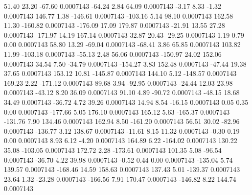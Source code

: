        51.40       23.20      -67.60     0.0007143
      -64.24        2.84       64.09     0.0007143
       -3.17        8.33       -1.32     0.0007143
      146.77        1.38     -146.61     0.0007143
     -103.16        5.14       98.10     0.0007143
      162.58       11.30     -160.82     0.0007143
     -176.09       17.09      179.87     0.0007143
      -21.91       13.55       27.28     0.0007143
     -171.97       14.19      167.14     0.0007143
       32.87       20.43      -29.25     0.0007143
        1.19        0.79        0.00     0.0007143
       58.80       13.29      -69.04     0.0007143
      -68.41        3.86       65.85     0.0007143
      103.82       11.99     -103.18     0.0007143
      -55.13        2.48       56.06     0.0007143
     -150.97       24.02      152.06     0.0007143
       34.54        7.50      -34.79     0.0007143
     -154.27        3.83      152.48     0.0007143
      -47.44       19.38       37.65     0.0007143
      153.12       10.81     -145.87     0.0007143
      144.10        5.12     -148.57     0.0007143
      169.23        2.22     -171.12     0.0007143
       89.68        3.94      -92.95     0.0007143
      -24.44       12.03       23.98     0.0007143
      -43.12        8.20       36.09     0.0007143
       91.10        4.89      -90.72     0.0007143
      -48.15       18.68       34.49     0.0007143
      -36.72        4.72       39.26     0.0007143
       14.94        8.54      -16.15     0.0007143
        0.05        0.35        0.00     0.0007143
     -177.66        5.05      176.10     0.0007143
      165.12        5.63     -165.37     0.0007143
     -131.76        7.90      134.46     0.0007143
      162.94        8.50     -161.20     0.0007143
       56.51       30.02      -82.96     0.0007143
     -136.77        3.12      138.67     0.0007143
      -11.61        8.15       11.32     0.0007143
       -0.30        0.19        0.00     0.0007143
        8.93        6.12       -4.20     0.0007143
      164.89        6.22     -164.02     0.0007143
      130.22       35.08     -103.05     0.0007143
      172.72        2.28     -173.61     0.0007143
      101.35        5.08      -96.54     0.0007143
      -36.70        4.22       39.98     0.0007143
       -0.52        0.44        0.00     0.0007143
     -135.04        5.74      139.57     0.0007143
     -168.46       14.59      158.63     0.0007143
      137.43        5.01     -139.37     0.0007143
       23.64        1.32      -23.28     0.0007143
     -166.56        7.91      170.47     0.0007143
     -146.82        8.22      144.74     0.0007143
